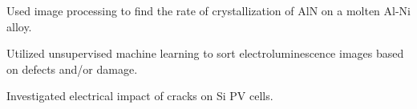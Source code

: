 \documentclass[10pt]{article}
\begin{document}
{{\begin{newitemize}
		\item Used image processing to find the rate of crystallization of AlN on a molten Al-Ni alloy.
		\item Utilized unsupervised machine learning to sort electroluminescence images based on defects and/or damage.
		\item Investigated electrical impact of cracks on Si PV cells.
	
		\end{newitemize}}
%	
	
}	
		
\end{document}
